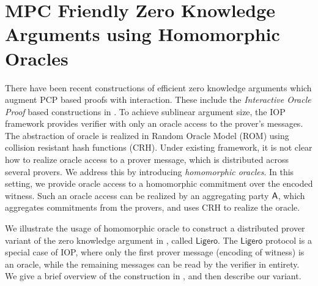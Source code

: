 \section{MPC Friendly Zero Knowledge Arguments using Homomorphic Oracles}
There have been recent constructions of efficient zero knowledge arguments which
augment PCP based proofs with interaction. These include the {\em Interactive
Oracle Proof} based constructions in \cite{ligero,aurora}. To achieve sublinear
argument size, the IOP framework provides verifier with only an oracle access to
the prover's messages. The abstraction of oracle is realized in Random Oracle
Model (ROM) using collision resistant hash functions (CRH). Under existing framework,
it is not clear how to realize oracle access to a prover message, which is
distributed across several provers. We address this by introducing {\em
homomorphic oracles}. In this setting, we provide oracle access to a
homomorphic commitment over the encoded witness. Such an oracle access can be
realized by an aggregating party $\mathsf{A}$, which aggregates commitments from the
provers, and uses CRH to realize the oracle. 

We illustrate the usage of homomorphic oracle to construct a distributed prover
variant of the zero knowledge argument in \cite{ligero}, called
$\mathsf{Ligero}$. The $\mathsf{Ligero}$ protocol is a special case of IOP,
where only the first prover message (encoding of witness) is an oracle, while
the remaining messages can be read by the verifier in entirety. We give a brief
overview of the construction in \cite{Ligero}, and then describe our variant.

